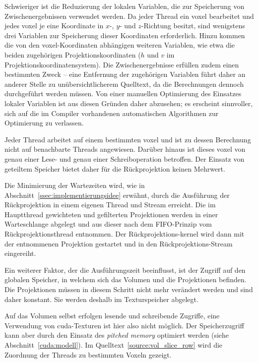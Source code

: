 Schwieriger ist die Reduzierung der lokalen Variablen, die zur Speicherung von Zwischenergebnissen verwendet werden. Da
jeder Thread ein \gls{voxel} bearbeitet und jedes \gls{voxel} je eine Koordinate in $x$-, $y$- und $z$-Richtung besitzt,
sind wenigstens drei Variablen zur Speicherung dieser Koordinaten erforderlich. Hinzu kommen die von den
\gls{voxel}-Koordinaten abhängigen weiteren Variablen, wie etwa die beiden zugehörigen Projektionskoordinaten ($h$ und
$v$ im Projektionskoordinatensystem). Die Zwischenergebnisse erfüllen zudem einen bestimmten Zweck -- eine Entfernung
der zugehörigen Variablen führt daher an anderer Stelle zu unübersichtlicherem Quelltext, da die Berechnungen dennoch
durchgeführt werden müssen. Von einer manuellen Optimierung des Einsatzes lokaler Variablen ist aus diesen Gründen daher
abzusehen; es erscheint sinnvoller, sich auf die im Compiler vorhandenen automatischen Algorithmen zur Optimierung zu
verlassen.

Jeder Thread arbeitet auf einem bestimmten \gls{voxel} und ist zu dessen Berechnung nicht auf benachbarte Threads
angewiesen. Darüber hinaus ist dieses \gls{voxel} von genau einer Lese- und genau einer Schreiboperation betroffen. Der
Einsatz von geteiltem Speicher bietet daher für die Rückprojektion keinen Mehrwert.

Die Minimierung der Wartezeiten wird, wie in Abschnitt~\ref{ssec:implementierungsidee} erwähnt, durch die Ausführung der
Rückprojektion in einem eigenen Thread und Stream erreicht. Die im Hauptthread gewichteten und gefilterten Projektionen
werden in einer Warteschlange abgelegt und aus dieser nach dem FIFO-Prinzip vom Rückprojektionsthread entnommen. Der
Rückprojektions-\gls{kernel} wird dann mit der entnommenen Projektion gestartet und in den Rückprojektions-Stream
eingereiht.

Ein weiterer Faktor, der die Ausführungszeit beeinflusst, ist der Zugriff auf den globalen Speicher, in welchem sich
das Volumen und die Projektionen befinden. Die Projektionen müssen in diesem Schritt nicht mehr verändert werden und
sind daher konstant. Sie werden deshalb im Texturspeicher abgelegt.

Auf das Volumen selbst erfolgen lesende und schreibende Zugriffe, eine Verwendung von \gls{cuda}-Texturen ist hier also
nicht möglich. Der Speicherzugriff kann aber durch den Einsatz des \textit{pitched memory} optimiert werden (siehe
Abschnitt~\ref{cuda:modell}). Im Quelltext~\ref{source:vol_slice_row} wird die Zuordnung der Threads zu bestimmten
Voxeln gezeigt.

